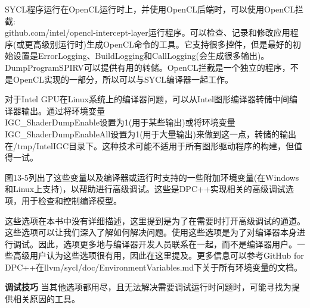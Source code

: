SYCL程序运行在OpenCL运行时上，并使用OpenCL后端时，可以使用OpenCL拦截:\\github.com/intel/opencl-intercept-layer运行程序。可以检查、记录和修改应用程序(或更高级别运行时)生成OpenCL命令的工具。它支持很多控件，但是最好的初始设置是ErrorLogging、BuildLogging和CallLogging(会生成很多输出)。DumpProgramSPIRV可以提供有用的转储。OpenCL拦截是一个独立的程序，不是OpenCL实现的一部分，所以可以与SYCL编译器一起工作。\par

对于Intel GPU在Linux系统上的编译器问题，可以从Intel图形编译器转储中间编译器输出。通过将环境变量\\IGC\_ShaderDumpEnable设置为1(用于某些输出)或将环境变量IGC\_ShaderDumpEnableAll设置为1(用于大量输出)来做到这一点，转储的输出在/tmp/IntelIGC目录下。这种技术可能不适用于所有图形驱动程序的构建，但值得一试。\par

图13-5列出了这些变量以及编译器或运行时支持的一些附加环境变量(在Windows和Linux上支持)，以帮助进行高级调试。这些是DPC++实现相关的高级调试选项，用于检查和控制编译模型。\par

这些选项在本书中没有详细描述，这里提到是为了在需要时打开高级调试的通道。这些选项可以让我们深入了解如何解决问题。使用这些选项是为了对编译器本身进行调试。因此，选项更多地与编译器开发人员联系在一起，而不是编译器用户。一些高级用户认为这些选项很有用，因此在这里提及。更多信息可以参考GitHub for DPC++在llvm/sycl/doc/EnvironmentVariables.md下关于所有环境变量的文档。\par

\begin{tcolorbox}[colback=red!5!white,colframe=red!75!black]
\textbf{调试技巧} 当其他选项都用尽，且无法解决需要调试运行时问题时，可能寻找为提供相关原因的工具。
\end{tcolorbox}

